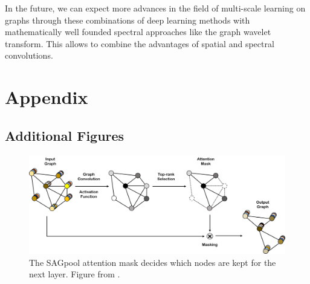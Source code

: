 \documentclass{article}
\begin{document}

In the future, we can expect more advances in the field of multi-scale learning on graphs through these combinations of deep learning methods with mathematically well founded spectral approaches like the graph wavelet transform. This allows to combine the advantages of spatial and spectral convolutions.




















\appendix
\section{Appendix}
\subsection{Additional Figures}

\begin{figure}[ht]
	\vskip 0.2in
	\begin{center}
		\centerline{\includegraphics[width=\columnwidth]{sagpool}}
		\caption{The SAGpool attention mask decides which nodes are kept for the next layer. Figure from \cite{lee2019self}.}
		\label{fig:sagpool}
	\end{center}
	\vskip -0.2in
\end{figure}
\end{document}

